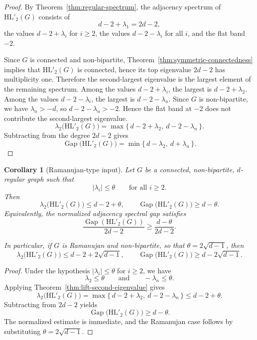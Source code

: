 \documentclass[11pt]{article}
\newtheorem{corollary}{Corollary}
\newcommand{\HL}{\mathrm{HL}}
\theoremstyle{plain}
\DeclareMathOperator{\Gap}{Gap}
\begin{document}
\begin{proof}
By Theorem~\ref{thm:regular-spectrum}, the adjacency spectrum of \(\HL'_2(G)\) consists of
\[
d-2+\lambda_1=2d-2,
\]
the values \(d-2+\lambda_i\) for \(i\ge 2\), the values \(d-2-\lambda_i\) for all \(i\), and the flat band
\(-2\).

Since \(G\) is connected and non-bipartite, Theorem~\ref{thm:symmetric-connectedness} implies that
\(\HL'_2(G)\) is connected, hence its top eigenvalue \(2d-2\) has multiplicity one. Therefore the
second-largest eigenvalue is the largest element of the remaining spectrum. Among the values
\(d-2+\lambda_i\), the largest is \(d-2+\lambda_2\). Among the values \(d-2-\lambda_i\), the largest is
\(d-2-\lambda_n\). Since \(G\) is non-bipartite, we have \(\lambda_n>-d\), so
\(d-2-\lambda_n>-2\). Hence the flat band at \(-2\) does not contribute the second-largest eigenvalue.
\[
\lambda_2\!\big(\HL'_2(G)\big)
=
\max\{\,d-2+\lambda_2,\ d-2-\lambda_n\,\}.
\]
Subtracting from the degree \(2d-2\) gives
\[
\Gap\!\big(\HL'_2(G)\big)
=
\min\{\,d-\lambda_2,\ d+\lambda_n\,\}.
\]
\end{proof}

\begin{corollary}[Ramanujan-type input]\label{cor:lift-ramanujan-type}
Let \(G\) be a connected, non-bipartite, \(d\)-regular graph such that
\[
|\lambda_i|\le \theta
\qquad\text{for all } i\ge 2.
\]
Then
\[
\lambda_2\!\big(\HL'_2(G)\big)\le d-2+\theta,
\qquad
\Gap\!\big(\HL'_2(G)\big)\ge d-\theta.
\]
Equivalently, the normalized adjacency spectral gap satisfies
\[
\frac{\Gap(\HL'_2(G))}{2d-2}\ge \frac{d-\theta}{2d-2}.
\]

In particular, if \(G\) is Ramanujan and non-bipartite, so that \(\theta=2\sqrt{d-1}\), then
\[
\lambda_2\!\big(\HL'_2(G)\big)\le d-2+2\sqrt{d-1},
\qquad
\Gap\!\big(\HL'_2(G)\big)\ge d-2\sqrt{d-1}.
\]
\end{corollary}

\begin{proof}
Under the hypothesis \(|\lambda_i|\le \theta\) for \(i\ge 2\), we have
\[
\lambda_2\le \theta
\qquad\text{and}\qquad
-\lambda_n\le \theta.
\]
Applying Theorem~\ref{thm:lift-second-eigenvalue} gives
\[
\lambda_2\!\big(\HL'_2(G)\big)
=
\max\{\,d-2+\lambda_2,\ d-2-\lambda_n\,\}
\le d-2+\theta.
\]
Subtracting from \(2d-2\) yields
\[
\Gap\!\big(\HL'_2(G)\big)\ge d-\theta.
\]
The normalized estimate is immediate, and the Ramanujan case follows by substituting
\(\theta=2\sqrt{d-1}\).
\end{proof}
\end{document}

